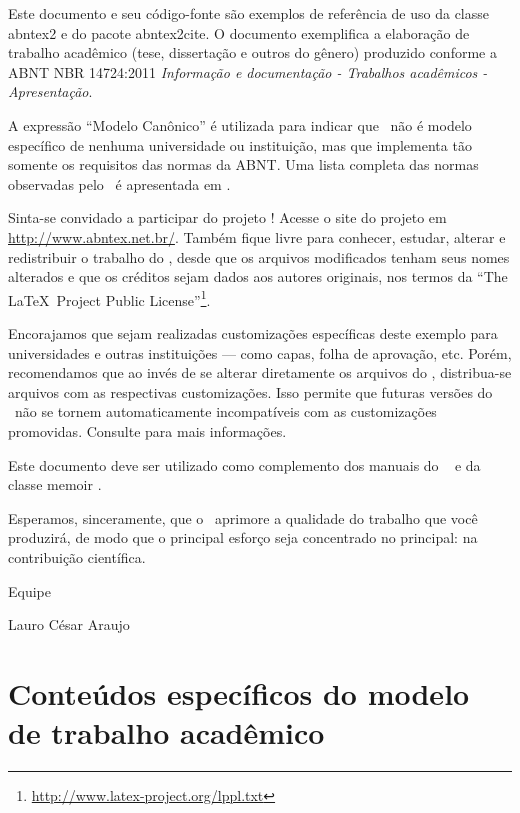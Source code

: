 \documentclass[
	12pt,				%
	openright,			%
    oneside,
	a4paper,			%
	chapter=TITLE,
	english,			%
	brazil				%
	]{abntex2}
\begin{document}
Este documento e seu código-fonte são exemplos de referência de uso da classe
\textsf{abntex2} e do pacote \textsf{abntex2cite}. O documento 
exemplifica a elaboração de trabalho acadêmico (tese, dissertação e outros do
gênero) produzido conforme a ABNT NBR 14724:2011 \emph{Informação e documentação
- Trabalhos acadêmicos - Apresentação}.

A expressão ``Modelo Canônico'' é utilizada para indicar que \abnTeX\ não é
modelo específico de nenhuma universidade ou instituição, mas que implementa tão
somente os requisitos das normas da ABNT. Uma lista completa das normas
observadas pelo \abnTeX\ é apresentada em .

Sinta-se convidado a participar do projeto \abnTeX! Acesse o site do projeto em
\url{http://www.abntex.net.br/}. Também fique livre para conhecer,
estudar, alterar e redistribuir o trabalho do \abnTeX, desde que os arquivos
modificados tenham seus nomes alterados e que os créditos sejam dados aos
autores originais, nos termos da ``The \LaTeX\ Project Public
License''\footnote{\url{http://www.latex-project.org/lppl.txt}}.

Encorajamos que sejam realizadas customizações específicas deste exemplo para
universidades e outras instituições --- como capas, folha de aprovação, etc.
Porém, recomendamos que ao invés de se alterar diretamente os arquivos do
\abnTeX, distribua-se arquivos com as respectivas customizações.
Isso permite que futuras versões do \abnTeX~não se tornem automaticamente
incompatíveis com as customizações promovidas. Consulte
 para mais informações.

Este documento deve ser utilizado como complemento dos manuais do \abnTeX\ 
\cite{abntex2classe,abntex2cite,abntex2cite-alf} e da classe \textsf{memoir}
\cite{memoir}. 

Esperamos, sinceramente, que o \abnTeX\ aprimore a qualidade do trabalho que
você produzirá, de modo que o principal esforço seja concentrado no principal:
na contribuição científica.

Equipe \abnTeX 

Lauro César Araujo



\chapter{Conteúdos específicos do modelo de trabalho acadêmico}\label{cap_trabalho_academico}
\end{document}
